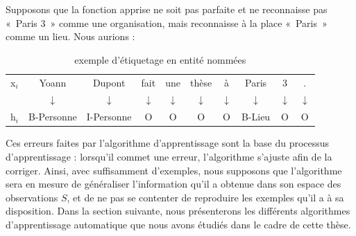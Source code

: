 \documentclass[PhD-Yoann-Dupont.tex]{subfiles}
\begin{document}
Supposons que la fonction apprise ne soit pas parfaite et ne reconnaisse pas «\ Paris 3\ » comme une organisation, mais reconnaisse à la place «\ Paris\ » comme un lieu. Nous aurions :

\begin{table}[ht!]
\centering
\begin{tabular}{lccccccccc}
x$_{i}$ & Yoann & Dupont & fait & une & thèse & à & Paris & 3 & . \\
        & $\downarrow$ & $\downarrow$ & $\downarrow$ & $\downarrow$ & $\downarrow$ & $\downarrow$ & $\downarrow$ & $\downarrow$ & $\downarrow$ \\
h$_{i}$ & B-Personne & I-Personne & O & O & O & O & B-Lieu & O & O \\
\end{tabular}
\caption{exemple d'étiquetage en entité nommées}
\label{tab:ner-tagging-example}
\end{table}

Ces erreurs faites par l'algorithme d'apprentissage sont la base du processus d'apprentissage : lorsqu'il commet une erreur, l'algorithme s'ajuste afin de la corriger. Ainsi, avec suffisamment d'exemples, nous supposons que l'algorithme sera en mesure de généraliser l'information qu'il a obtenue dans son espace des observations $S$, et de ne pas se contenter de reproduire les exemples qu'il a à sa disposition. Dans la section suivante, nous présenterons les différents algorithmes d'apprentissage automatique que nous avons étudiés dans le cadre de cette thèse.
\end{document}
